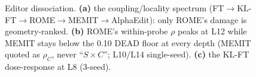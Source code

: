 \begin{figure}[t]
\centering

\caption{Editor dissociation. \textbf{(a)} the coupling/locality spectrum
(FT$\to$KL-FT$\to$ROME$\to$MEMIT$\to$AlphaEdit): only ROME's damage is geometry-ranked.
\textbf{(b)} ROME's within-probe $\rho$ peaks at L12 while MEMIT stays below the 0.10
DEAD floor at every depth (MEMIT quoted as $\rho_C$, never ``$S\times C$''; L10/L14
single-seed). \textbf{(c)} the KL-FT dose-response at L8 (3-seed).}
\label{fig:editor}
\end{figure}
